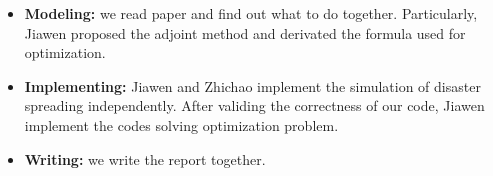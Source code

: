 \begin{itemize}
	\item \textbf{Modeling: } we read paper and find out what to do together. Particularly, Jiawen proposed the adjoint method and derivated the formula used for optimization.
	\item \textbf{Implementing: } Jiawen and Zhichao implement the simulation of disaster spreading independently. After validing the correctness of our code, Jiawen implement the codes solving optimization problem.
	\item \textbf{Writing: } we write the report together.
\end{itemize}